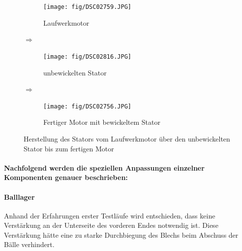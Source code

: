 \begin{figure}[h!]
    \begin{center}
        \begin{minipage}[c]{0.25\textwidth}
            \begin{subfigure}[a]{\textwidth}
                \texttt{[image: fig/DSC02759.JPG]}
                \caption{Laufwerkmotor}
                \label{m_motor_stator_before}
            \end{subfigure}
        \end{minipage}
        \begin{minipage}[c]{0.05\textwidth}
            \Huge$\Rightarrow$
        \end{minipage}
        \begin{minipage}[c]{0.25\textwidth}
            \begin{subfigure}[a]{\textwidth}
                \texttt{[image: fig/DSC02816.JPG]}
                \caption{unbewickelten Stator}
                \label{m_motor_stator_empty}
            \end{subfigure}
        \end{minipage}
        \begin{minipage}[c]{0.05\textwidth}
            \Huge$\Rightarrow$
        \end{minipage}
        \begin{minipage}[c]{0.25\textwidth}
            \begin{subfigure}[a]{\textwidth}
                \texttt{[image: fig/DSC02756.JPG]}
                \caption{Fertiger Motor mit bewickeltem Stator}
                \label{m_motor_stator_finished}
            \end{subfigure}
        \end{minipage}
    \end{center}
    \caption{Herstellung des Stators vom Laufwerkmotor über den unbewickelten Stator bis zum fertigen Motor}
    \label{m_motor_stator}
\end{figure}
\FloatBarrier

\paragraph{Nachfolgend werden die speziellen Anpassungen einzelner Komponenten genauer beschrieben:}

\paragraph{Balllager}
Anhand der Erfahrungen erster Testläufe wird entschieden, dass keine 
Verstärkung an der Unterseite des vorderen Endes notwendig ist. Diese 
Verstärkung hätte eine zu starke Durchbiegung des Blechs beim 
Abschuss der Bälle verhindert.

